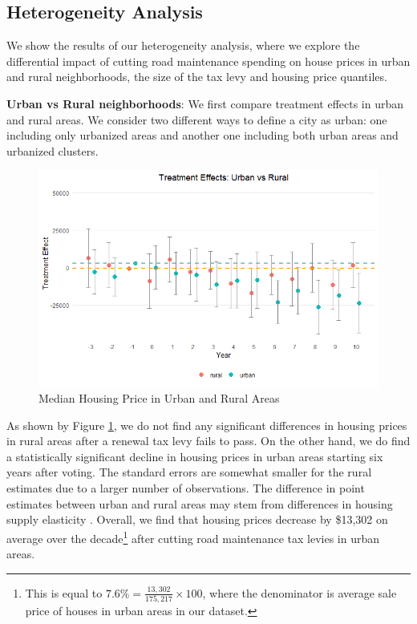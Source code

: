 \subsection{Heterogeneity Analysis} 

We show the results of our heterogeneity analysis, where we explore the differential impact of cutting road maintenance spending on house prices in urban and rural neighborhoods, the size of the tax levy and housing price quantiles.

\vskip 0.5cm

\textbf{Urban vs Rural neighborhoods}: We first compare treatment effects in urban and rural areas. We consider two different ways to define a city as urban: one including only urbanized areas and another one including both urban areas and urbanized clusters.

\begin{figure}[htbp]
    \centering
    \includegraphics[width=\textwidth,keepaspectratio]{images/tes_covs_ua_reg.png}        
    \caption{Median Housing Price in Urban and Rural Areas}
    \label{fig:tes_covs_ua}
\end{figure}

As shown by Figure \ref{fig:tes_covs_ua}, we do not find any significant differences in housing prices in rural areas after a renewal tax levy fails to pass. On the other hand, we do find a statistically significant decline in housing prices in urban areas starting six years after voting. The standard errors are somewhat smaller for the rural estimates due to a larger number of observations. The difference in point estimates between urban and rural areas may stem from differences in housing supply elasticity \citep{brasington2002}. Overall, we find that housing prices decrease by \$13,302 on average over the decade\footnote{This is equal to $7.6\% = \frac{13,302}{175,217} \times 100$, where the denominator is average sale price of houses in urban areas in our dataset.} after cutting road maintenance tax levies in urban areas. 

